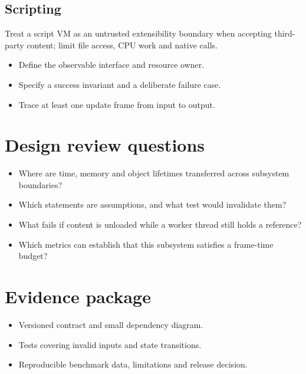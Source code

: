 \documentclass[11pt,letterpaper]{article}
\begin{document}
\subsection{Scripting}
Treat a script VM as an untrusted extensibility boundary when accepting third-party content; limit file access, CPU work and native calls.

\begin{itemize}
\item Define the observable interface and resource owner.
\item Specify a success invariant and a deliberate failure case.
\item Trace at least one update frame from input to output.
\end{itemize}
\section{Design review questions}
\begin{itemize}
\item Where are time, memory and object lifetimes transferred across subsystem boundaries?
\item Which statements are assumptions, and what test would invalidate them?
\item What fails if content is unloaded while a worker thread still holds a reference?
\item Which metrics can establish that this subsystem satisfies a frame-time budget?
\end{itemize}
\section{Evidence package}
\begin{itemize}
\item Versioned contract and small dependency diagram.
\item Tests covering invalid inputs and state transitions.
\item Reproducible benchmark data, limitations and release decision.
\end{itemize}
\end{document}
